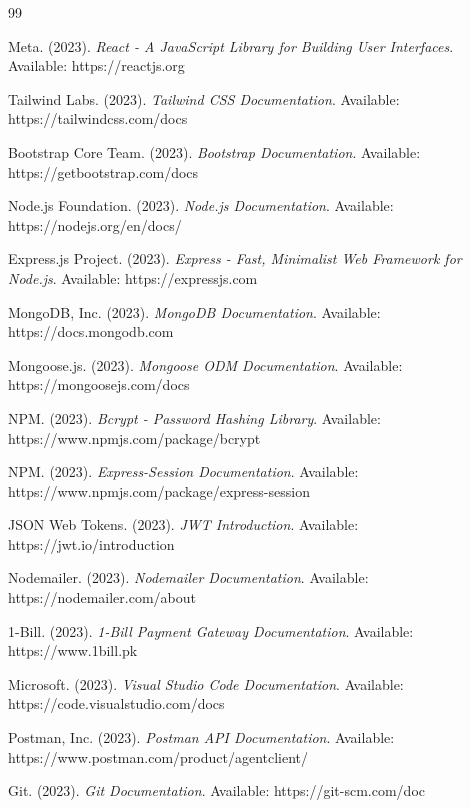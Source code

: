 \documentclass[12pt,a4paper]{report}
\begin{document}
\begin{thebibliography}{99}

Meta. (2023). \textit{React - A JavaScript Library for Building User Interfaces}. 
Available: https://reactjs.org

Tailwind Labs. (2023). \textit{Tailwind CSS Documentation}. 
Available: https://tailwindcss.com/docs

Bootstrap Core Team. (2023). \textit{Bootstrap Documentation}. 
Available: https://getbootstrap.com/docs

Node.js Foundation. (2023). \textit{Node.js Documentation}. 
Available: https://nodejs.org/en/docs/

Express.js Project. (2023). \textit{Express - Fast, Minimalist Web Framework for Node.js}. 
Available: https://expressjs.com

MongoDB, Inc. (2023). \textit{MongoDB Documentation}. 
Available: https://docs.mongodb.com

Mongoose.js. (2023). \textit{Mongoose ODM Documentation}. 
Available: https://mongoosejs.com/docs

NPM. (2023). \textit{Bcrypt - Password Hashing Library}. 
Available: https://www.npmjs.com/package/bcrypt

NPM. (2023). \textit{Express-Session Documentation}. 
Available: https://www.npmjs.com/package/express-session

JSON Web Tokens. (2023). \textit{JWT Introduction}. 
Available: https://jwt.io/introduction

Nodemailer. (2023). \textit{Nodemailer Documentation}. 
Available: https://nodemailer.com/about

1-Bill. (2023). \textit{1-Bill Payment Gateway Documentation}. 
Available: https://www.1bill.pk

Microsoft. (2023). \textit{Visual Studio Code Documentation}. 
Available: https://code.visualstudio.com/docs

Postman, Inc. (2023). \textit{Postman API Documentation}. 
Available: https://www.postman.com/product/agentclient/

Git. (2023). \textit{Git Documentation}. 
Available: https://git-scm.com/doc


\end{thebibliography}
\end{document}

